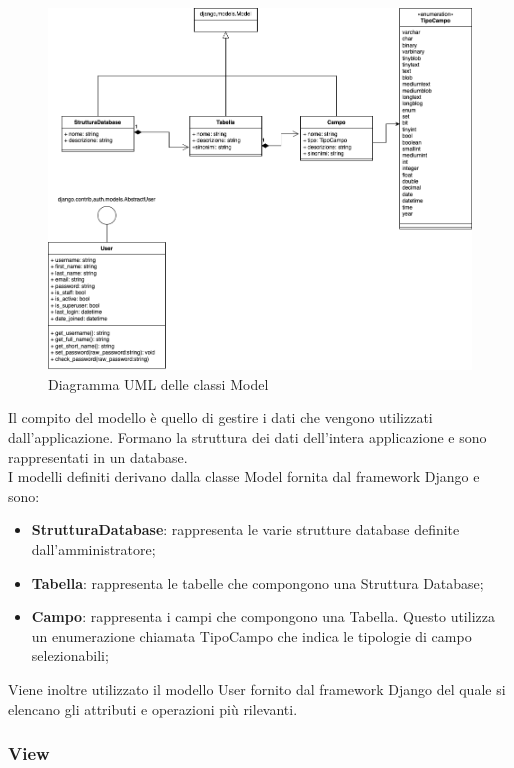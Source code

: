 \documentclass[5pt]{article}
\begin{document}
	\begin{figure}[H]
		\includegraphics[scale=0.55]{UML_classes/models.png}
		\caption{Diagramma UML delle classi Model}
		\centering
	\end{figure}	
	
	Il compito del modello è quello di gestire i dati che vengono utilizzati dall'applicazione. Formano la struttura dei dati dell'intera applicazione e sono rappresentati in un database.\\
	
	I modelli definiti derivano dalla classe Model fornita dal framework Django e sono:
	\begin{itemize}
		\item \textbf{StrutturaDatabase}: rappresenta le varie strutture database definite dall'amministratore;
		\item \textbf{Tabella}: rappresenta le tabelle che compongono una Struttura Database;
		\item \textbf{Campo}: rappresenta i campi che compongono una Tabella. Questo utilizza un enumerazione chiamata TipoCampo che indica le tipologie di campo selezionabili;
	\end{itemize}
	
	Viene inoltre utilizzato il modello User fornito dal framework Django del quale si elencano gli attributi e operazioni più rilevanti.\\
	
	
	\subsubsection{View}
	
\end{document}
